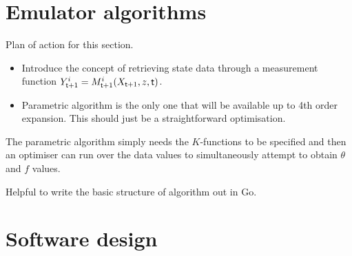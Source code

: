 \section{\sffamily Emulator algorithms}

Plan of action for this section.
\begin{itemize}
\item{Introduce the concept of retrieving state data through a measurement function $Y^i_{{\sf t}+1} = M^i_{{\sf t}+1}(X_{{\sf t}+1},z,{\sf t})$.}
\item{Parametric algorithm is the only one that will be available up to 4th order expansion. This should just be a straightforward optimisation.}
\end{itemize}

The parametric algorithm simply needs the $K$-functions to be specified and then an optimiser can run over the data values to simultaneously attempt to obtain $\theta$ and $f$ values.

Helpful to write the basic structure of algorithm out in Go.

\section{\sffamily Software design}

